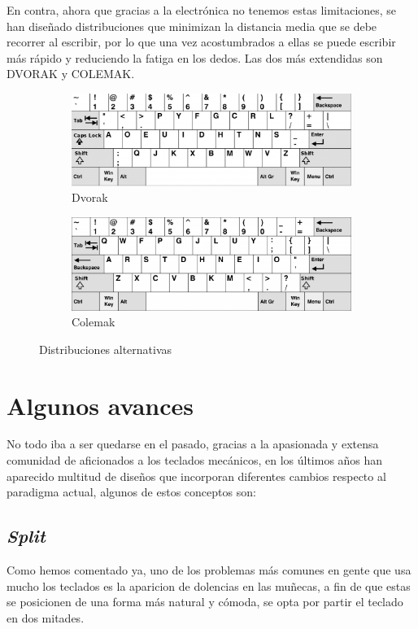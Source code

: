   En contra, ahora que gracias a la electrónica no tenemos estas limitaciones, se han diseñado distribuciones que minimizan la distancia media que se debe recorrer al escribir, por lo que una vez acostumbrados a ellas se puede escribir más rápido y reduciendo la fatiga en los dedos. Las dos más extendidas son DVORAK y COLEMAK. 
  \begin{figure}[H]
    \begin{subfigure}[b]{.5\textwidth}
      \centering
      \includegraphics[width=.6\textwidth]{images/dvorak}
      \caption{Dvorak}
    \end{subfigure} 
    \hfill
    \begin{subfigure}[b]{.5\textwidth}
      \centering
      \includegraphics[width=.6\textwidth]{images/colemak}
      \caption{Colemak}
    \end{subfigure}
    \caption{Distribuciones alternativas}
  \end{figure}

  \section{Algunos avances}
  No todo iba a ser quedarse en el pasado, gracias a la apasionada y extensa comunidad de aficionados a los teclados mecánicos, en los últimos años han aparecido multitud de diseños que incorporan diferentes cambios respecto al paradigma actual, algunos de estos conceptos son:
    \subsection{\textit{Split}}
    Como hemos comentado ya, uno de los problemas más comunes en gente que usa mucho los teclados es la aparicion de dolencias en las muñecas, a fin de que estas se posicionen de una forma más natural y cómoda, se opta por partir el teclado en dos mitades.
    
